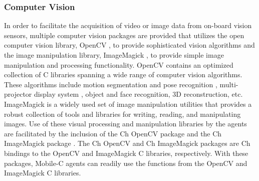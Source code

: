     \subsubsection{Computer Vision}
      In order to facilitate the acquisition of video or image data from 
        on-board vision sensors, multiple computer vision packages are provided 
        that utilizes the open computer vision library, OpenCV 
        \cite{OpenCVWebSite}, to provide sophisticated vision algorithms and the 
        image manipulation library, ImageMagick \cite{imagemagick_webpage}, to 
        provide simple image manipulation and processing functionality.
     OpenCV contains an optimized collection of C libraries spanning a wide 
       range of computer vision algorithms.
     These algorithms include motion segmentation and pose recognition 
       \cite{Bradski2000}, multi-projector display system \cite{Yang2001}, 
       object and face recognition, 3D reconstruction, etc.
     ImageMagick is a widely used set of image manipulation utilities that 
       provides a robust collection of tools and libraries for writing, reading, 
       and manipulating images.
     Use of these visual processing and manipulation libraries by
       the agents are facilitated by the inclusion of the Ch OpenCV 
       package \cite{ChOpenCV} and the Ch ImageMagick package 
       \cite{ChImageMagick}.
     The Ch OpenCV and Ch ImageMagick packages are Ch bindings to the
       OpenCV and ImageMagick C libraries, respectively.
     With these packages, Mobile-C agents can readily use the functions from 
       the OpenCV and ImageMagick C libraries.



